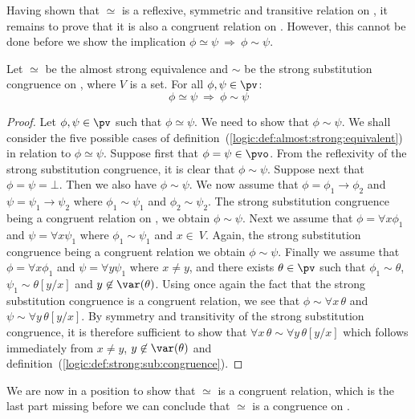 Having shown that $\simeq$ is a reflexive, symmetric and transitive
relation on \pv, it remains to prove that it is also a congruent
relation on \pv. However, this cannot be done before we show the
implication $\phi\simeq\psi\ \Rightarrow\ \phi\sim\psi$.

\begin{prop}\label{logic:prop:almost:strong:implies:strong}
Let $\simeq$ be the almost strong equivalence and $\sim$ be the
strong substitution congruence on \pv, where $V$ is a set. For all
$\phi,\psi\in\pv$:
    \[
    \phi\simeq\psi\ \Rightarrow\ \phi\sim\psi
    \]
\end{prop}
\begin{proof}
Let $\phi,\psi\in\pv$ such that $\phi\simeq\psi$. We need to show
that $\phi\sim\psi$. We shall consider the five possible cases of
definition~(\ref{logic:def:almost:strong:equivalent}) in relation to
$\phi\simeq\psi$. Suppose first that $\phi=\psi\in\pvo$. From the
reflexivity of the strong substitution congruence, it is clear that
$\phi\sim\psi$. Suppose next that $\phi=\psi=\bot$. Then we also
have $\phi\sim\psi$. We now assume that $\phi=\phi_{1}\to\phi_{2}$
and $\psi=\psi_{1}\to\psi_{2}$ where $\phi_{1}\sim\psi_{1}$ and
$\phi_{2}\sim\psi_{2}$. The strong substitution congruence being a
congruent relation on \pv, we obtain $\phi\sim\psi$. Next we assume
that $\phi=\forall x\phi_{1}$ and $\psi=\forall x\psi_{1}$ where
$\phi_{1}\sim\psi_{1}$ and $x\in\ V$. Again, the strong substitution
congruence being a congruent relation we obtain $\phi\sim\psi$.
Finally we assume that $\phi=\forall x\phi_{1}$ and $\psi=\forall
y\psi_{1}$ where $x\neq y$, and there exists $\theta\in\pv$ such
that $\phi_{1}\sim\theta$, $\psi_{1}\sim\theta[y/x]$ and
$y\not\in\var(\theta)$. Using once again the fact that the strong
substitution congruence is a congruent relation, we see that
$\phi\sim\forall x\,\theta$ and $\psi\sim\forall y\,\theta[y/x]$. By
symmetry and transitivity of the strong substitution congruence, it
is therefore sufficient to show that $\forall x\,\theta\sim\forall
y\,\theta[y/x]$ which follows immediately from $x\neq y$,
$y\not\in\var(\theta)$ and
definition~(\ref{logic:def:strong:sub:congruence}).
\end{proof}

We are now in a position to show that $\simeq$ is a congruent
relation, which is the last part missing before we can conclude that
$\simeq$ is a congruence on \pv.

